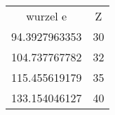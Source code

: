 \begin{table}
\begin{tabular}{cc}
wurzel e & Z \\
94.3927963353 & 30 \\
104.737767782 & 32 \\
115.455619179 & 35 \\
133.154046127 & 40 \\
\end{tabular}
\end{table}
